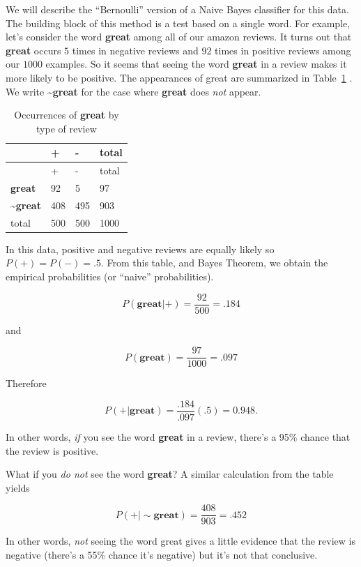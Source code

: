 \documentclass[
  11pt,
  letterpaper,
]{scrbook}
\theoremstyle{plain}
\theoremstyle{remark}
\begin{document}
We will describe the ``Bernoulli'' version of a Naive Bayes classifier
for this data. The building block of this method is a test based on a
single word. For example, let's consider the word \textbf{great} among
all of our amazon reviews. It turns out that \textbf{great} occurs \(5\)
times in negative reviews and \(92\) times in positive reviews among our
\(1000\) examples. So it seems that seeing the word \textbf{great} in a
review makes it more likely to be positive. The appearances of great are
summarized in Table~\ref{tbl-great} . We write
\textasciitilde{}\textbf{great} for the case where \textbf{great} does
\emph{not} appear.

\hypertarget{tbl-great}{}
\begin{longtable}[]{@{}llll@{}}
\caption{\label{tbl-great}Occurrences of \textbf{great} by type of
review}\tabularnewline
\toprule\noalign{}
& + & - & total \\
\midrule\noalign{}
\endfirsthead
\toprule\noalign{}
& + & - & total \\
\midrule\noalign{}
\endhead
\bottomrule\noalign{}
\endlastfoot
\textbf{great} & 92 & 5 & 97 \\
\textasciitilde{}\textbf{great} & 408 & 495 & 903 \\
total & 500 & 500 & 1000 \\
\end{longtable}

In this data, positive and negative reviews are equally likely so
\(P(+)=P(-)=.5\). From this table, and Bayes Theorem, we obtain the
empirical probabilities (or ``naive'' probabilities).

\[
P(\mathbf{great} | +) = \frac{92}{500} = .184
\]

and

\[
P(\mathbf{great}) = \frac{97}{1000} = .097
\]

Therefore

\[
P(+|\mathbf{great}) = \frac{.184}{.097}(.5) = 0.948.
\]

In other words, \emph{if} you see the word \textbf{great} in a review,
there's a 95\% chance that the review is positive.

What if you \emph{do not} see the word \textbf{great}? A similar
calculation from the table yields

\[
P(+|\sim\mathbf{great}) = \frac{408}{903} = .452
\]

In other words, \emph{not} seeing the word great gives a little evidence
that the review is negative (there's a 55\% chance it's negative) but
it's not that conclusive.
\end{document}

